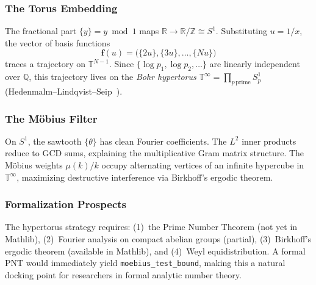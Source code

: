 \documentclass[11pt,a4paper]{article}
\theoremstyle{definition}
\theoremstyle{remark}
\newcommand{\lean}[1]{\texttt{#1}}
\begin{document}
\subsubsection*{The Torus Embedding}

The fractional part $\{y\} = y \bmod 1$ maps
$\mathbb{R} \to \mathbb{R}/\mathbb{Z} \cong S^1$.
Substituting $u = 1/x$, the vector of basis functions
\[
  \mathbf{f}(u)
  = \bigl(\{2u\}, \{3u\}, \ldots, \{Nu\}\bigr)
\]
traces a trajectory on $\mathbb{T}^{N-1}$.
Since $\{\log p_1, \log p_2, \ldots\}$ are linearly independent
over $\mathbb{Q}$, this trajectory lives on the
\emph{Bohr hypertorus}
$\mathbb{T}^\infty = \prod_{p\,\text{prime}} S^1_p$
(Hedenmalm--Lindqvist--Seip~\cite{hedenmalm1997}).

\subsubsection*{The M\"obius Filter}

On $S^1$, the sawtooth $\{\theta\}$ has clean Fourier coefficients.
The $L^2$ inner products reduce to GCD sums, explaining the
multiplicative Gram matrix structure.
The M\"obius weights $\mu(k)/k$ occupy alternating vertices of
an infinite hypercube in $\mathbb{T}^\infty$, maximizing
destructive interference via Birkhoff's ergodic theorem.

\subsubsection*{Formalization Prospects}

The hypertorus strategy requires:
(1)~the Prime Number Theorem (not yet in Mathlib),
(2)~Fourier analysis on compact abelian groups (partial),
(3)~Birkhoff's ergodic theorem (available in Mathlib), and
(4)~Weyl equidistribution.
A formal PNT would immediately yield
\lean{moebius\_test\_bound}, making this a natural
docking point for researchers in formal analytic number theory.


\end{document}
